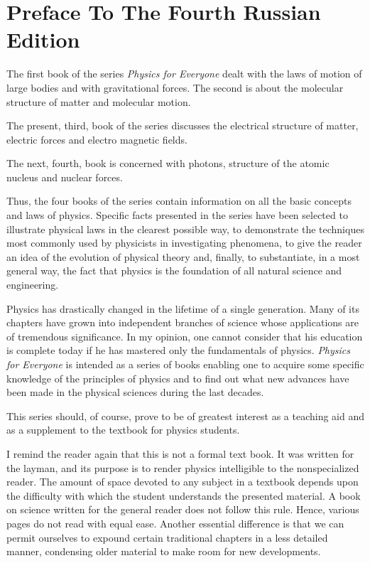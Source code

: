 

\chapter[Preface]{Preface To The \newline Fourth Russian Edition}

The first book of the series \emph{Physics for Everyone} dealt with the laws of motion of large bodies and with gravi­tational forces. The second is about the molecular structure of matter and molecular motion.

The present, third, book of the series discusses the electrical structure of matter, electric forces and electro­ magnetic fields.

The next, fourth, book is concerned with photons, structure of the atomic nucleus and nuclear forces.

Thus, the four books of the series contain information on all the basic concepts and laws of physics. Specific facts presented in the series have been selected to illustrate physical laws in the clearest possible way, to demonstrate the techniques most commonly used by physicists in investigating phenomena, to give the reader an idea of the evolution of physical theory and, finally, to substantiate, in a most general way, the fact that physics is the foundation of all natural science and engineering.

Physics has drastically changed in the lifetime of a single generation. Many of its chapters have grown into independent branches of science whose applications are of tremendous significance. In my opinion, one cannot consider that his education is complete today if he has mastered only the fundamentals of physics. \emph{Physics for Everyone} is intended as a series of books enabling one to acquire some specific knowledge of the principles of physics and to find out what new advances have been made in the physical sciences during the last decades.

This series should, of course, prove to be of greatest interest as a teaching aid and as a supplement to the textbook for physics students.

I remind the reader again that this is not a formal text­ book. It was written for the layman, and its purpose is to render physics intelligible to the nonspecialized reader. The amount of space devoted to any subject in a textbook depends upon the difficulty with which the student understands the presented material. A book on science written for the general reader does not follow this rule. Hence, various pages do not read with equal ease. Another essential difference is that we can permit ourselves to expound certain traditional chapters in a less detailed manner, condensing older material to make room for new developments.

